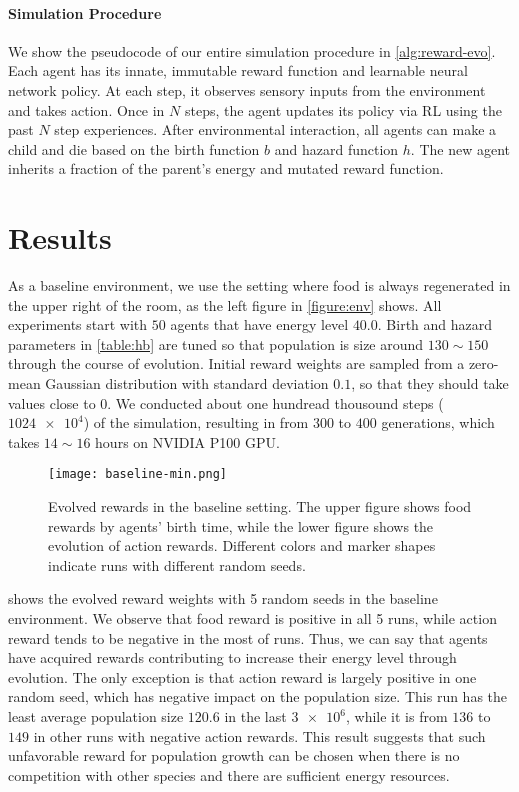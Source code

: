 \paragraph{Simulation Procedure}
We show the pseudocode of our entire simulation procedure in \cref{alg:reward-evo}. Each agent has its innate, immutable reward function and learnable neural network policy. At each step, it observes sensory inputs from the environment and takes action. Once in $N$ steps, the agent updates its policy via RL using the past $N$ step experiences. After environmental interaction, all agents can make a child and die based on the birth function $b$ and hazard function $h$. The new agent inherits a fraction of the parent's energy and mutated reward function.

\section{Results}
As a baseline environment, we use the setting where food is always regenerated in the upper right of the room, as the left figure in \cref{figure:env} shows. All experiments start with $50$ agents that have energy level $40.0$. Birth and hazard parameters in \cref{table:hb} are tuned so that population is size around $130\sim 150$ through the course of evolution. Initial reward weights are sampled from a zero-mean Gaussian distribution with standard deviation $0.1$, so that they should take values close to $0$. We conducted about one hundread thousound steps ($\num{1024e4}$) of the simulation, resulting in from $300$ to $400$ generations, which takes $14\sim16$ hours on NVIDIA P100 GPU.

\begin{figure}[!htb]
  \centering
  \texttt{[image: baseline-min.png]}
  \caption{
    Evolved rewards in the baseline setting.
    The upper figure shows food rewards by agents' birth time, while the lower figure shows the evolution of action rewards.
    Different colors and marker shapes indicate runs with different random seeds.
  }\label{figure:result-baseline}
\end{figure}

 shows the evolved reward weights with 5 random seeds in the baseline environment. We observe that food reward is positive in all 5 runs, while action reward tends to be negative in the most of runs. Thus, we can say that agents have acquired rewards contributing to increase their energy level through evolution. The only exception is that action reward is largely positive in one random seed, which has negative impact on the population size. This run has the least average population size $120.6$ in the last $\num{3e6}$, while it is from $136$ to $149$ in other runs with negative action rewards. This result suggests that such unfavorable reward for population growth can be chosen when there is no competition with other species and there are sufficient energy resources.

